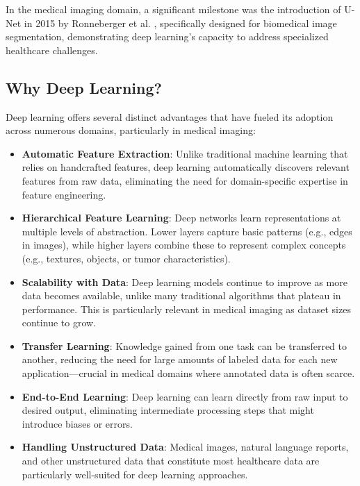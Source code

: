 In the medical imaging domain, a significant milestone was the introduction of U-Net in 2015 by Ronneberger et al. \cite{ronneberger2015unet}, specifically designed for biomedical image segmentation, demonstrating deep learning's capacity to address specialized healthcare challenges.

\subsection{Why Deep Learning?}
\label{sec:why_dl}
Deep learning offers several distinct advantages that have fueled its adoption across numerous domains, particularly in medical imaging:

\begin{itemize}
  \item \textbf{Automatic Feature Extraction}: Unlike traditional machine learning that relies on handcrafted features, deep learning automatically discovers relevant features from raw data, eliminating the need for domain-specific expertise in feature engineering.

  \item \textbf{Hierarchical Feature Learning}: Deep networks learn representations at multiple levels of abstraction. Lower layers capture basic patterns (e.g., edges in images), while higher layers combine these to represent complex concepts (e.g., textures, objects, or tumor characteristics).

  \item \textbf{Scalability with Data}: Deep learning models continue to improve as more data becomes available, unlike many traditional algorithms that plateau in performance. This is particularly relevant in medical imaging as dataset sizes continue to grow.

  \item \textbf{Transfer Learning}: Knowledge gained from one task can be transferred to another, reducing the need for large amounts of labeled data for each new application—crucial in medical domains where annotated data is often scarce.

  \item \textbf{End-to-End Learning}: Deep learning can learn directly from raw input to desired output, eliminating intermediate processing steps that might introduce biases or errors.

  \item \textbf{Handling Unstructured Data}: Medical images, natural language reports, and other unstructured data that constitute most healthcare data are particularly well-suited for deep learning approaches.
\end{itemize}

